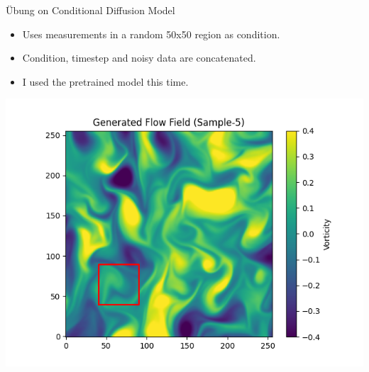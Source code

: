 \documentclass[./main.tex]{subfiles}
\begin{document}
\begin{frame}[label={sec:org5a9dfa2}]{Übung on Conditional Diffusion Model}
\begin{itemize}
\item Uses measurements in a random 50x50 region as condition.
\item Condition, timestep and noisy data are concatenated.
\item I used the pretrained model this time.
\end{itemize}
\begin{adjustbox}{width=\textwidth,totalheight=0.6\paperheight,keepaspectratio,center}
\includegraphics[width=\textwidth]{./figs/generated_image_5.png}
\end{adjustbox}
\end{frame}
\end{document}

